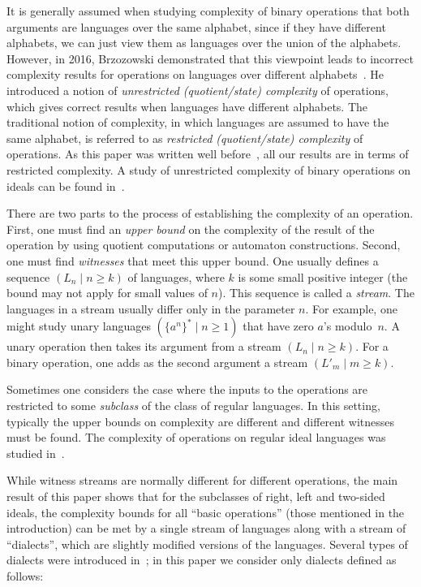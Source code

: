 \documentclass[final]{dmtcs-episciences}
\renewcommand{\ge}{\geqslant}
\theoremstyle{definition}
\theoremstyle{remark}
\begin{document}
It is generally assumed when studying complexity of binary operations that both arguments are languages over the same alphabet, since if they have different alphabets, we can just view them as languages over the union of the alphabets.
However, in 2016, Brzozowski demonstrated that this viewpoint leads to incorrect complexity results for operations on languages over different alphabets~\cite{Brz16}. He introduced a notion of \emph{unrestricted (quotient/state) complexity} of operations, which gives correct results when languages have different alphabets. The traditional notion of complexity, in which languages are assumed to have the same alphabet, is referred to as \emph{restricted (quotient/state) complexity} of operations.
As this paper was written well before~\cite{Brz16}, all our results are in terms of restricted complexity.
A study of unrestricted complexity of binary operations on ideals can be found in~\cite{BrCo16}.

There are two parts to the process of  establishing the  complexity of an operation.
First, one must find an \emph{upper bound} on the  complexity of the result of the operation
by using quotient computations or automaton constructions.
Second, one must find \emph{witnesses}  that meet this upper bound.
One usually defines a sequence $(L_n\mid n\ge k)$ of languages, where  $k$ is some small positive integer (the bound may not apply for small values of $n$).  This sequence is called a \emph{stream}. The languages  in a stream usually differ only in the parameter $n$. 
For example, 
one might study unary languages $(\{a^n\}^*\mid n\ge 1)$ that have zero $a$'s modulo~$n$. 
A unary operation then takes its argument from a stream $(L_n\mid n\ge k)$.
For a binary operation, one adds as the second argument a stream $(L'_m\mid m\ge k)$. 

Sometimes one considers the case where the inputs to the operations are restricted to some \emph{subclass} of the class of regular languages. In this setting, typically the upper bounds on complexity are different and different witnesses must be found. The complexity of operations on regular ideal languages was studied in~\cite{BJL13}.

While witness streams are normally different for different operations, the main result of this paper shows that for the subclasses of right, left and two-sided ideals, the complexity bounds for all ``basic operations'' (those mentioned in the introduction) can be met by a single stream of languages along with a stream of ``dialects'', which are slightly modified versions of the languages. Several types of dialects were introduced in~\cite{Brz13}; in this paper we consider only dialects defined as follows:
\end{document}

